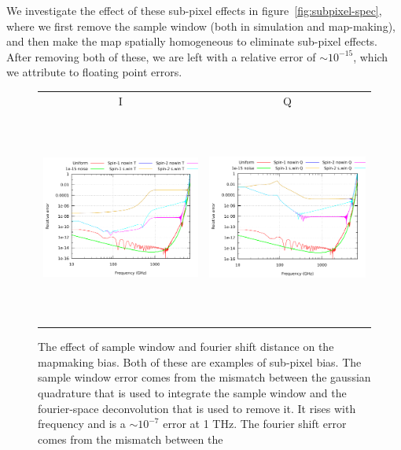 \documentclass{article}
\begin{document}
We investigate the effect of these sub-pixel effects in
figure~\ref{fig:subpixel-spec}, where we first remove the
sample window (both in simulation and map-making), and then
make the map spatially homogeneous to eliminate sub-pixel effects.
After removing both of these, we are left with a relative error of
$\sim10^{-15}$, which we attribute to floating point errors.
\begin{figure}
	\centering
	\hspace*{-2mm}\begin{tabular}{cc}
		I & Q \\
		\includegraphics[height=70mm,clip,trim=0 0 0 0]{plots/spec_error_rel_v4_log_log_spin_win_T.pdf} &
		\includegraphics[height=70mm,clip,trim=30mm 0 0 0]{plots/spec_error_rel_v4_log_log_spin_win_Q.pdf}
	\end{tabular}
	\caption{The effect of sample window and fourier shift distance on the
	mapmaking bias. Both of these are examples of sub-pixel bias. The sample
	window error comes from the mismatch between the gaussian quadrature that is
	used to integrate the sample window and the fourier-space deconvolution that
	is used to remove it. It rises with frequency and is a $\sim 10^{-7}$ error
	at 1 THz. The fourier shift error comes from the mismatch between the
}
\end{figure}
\end{document}
